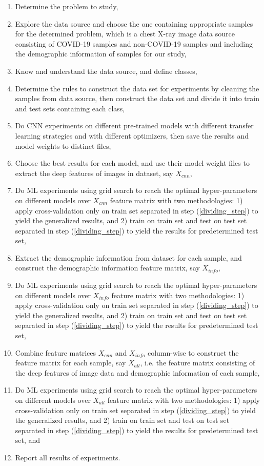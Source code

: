 \begin{enumerate}
    \item Determine the problem to study,
    \item Explore the data source and choose the one containing appropriate samples  for the determined problem, which is a chest X-ray image data source consisting of COVID-19 samples and non-COVID-19 samples and including the demographic information of samples for our study,
    \item Know and understand the data source, and define classes,
    \item Determine the rules to construct the data set for experiments by cleaning the samples from data source, then construct the data set and divide it into train and test sets containing each class, \label{dividing_step}
    \item Do CNN experiments on different pre-trained models with different transfer learning strategies and with different optimizers, then save the results and model weights to distinct files,
    \item Choose the best results for each model, and use their model weight files to extract the deep features of images in dataset, say $X_{cnn}$,
    \item Do ML experiments using grid search to reach the optimal hyper-parameters on different models over $X_{cnn}$ feature matrix with two methodologies: 1) apply cross-validation only on train set separated in step (\ref{dividing_step}) to yield the generalized results, and 2) train on train set and test on test set separated in step (\ref{dividing_step}) to yield the results for predetermined test set, \label{ML_experiment_step}
    \item Extract the demographic information from dataset for each sample, and construct the demographic information feature matrix, say $X_{info}$,
    \item Do ML experiments using grid search to reach the optimal hyper-parameters on different models over $X_{info}$ feature matrix with two methodologies: 1) apply cross-validation only on train set separated in step (\ref{dividing_step}) to yield the generalized results, and 2) train on train set and test on test set separated in step (\ref{dividing_step}) to yield the results for predetermined test set,
    \item Combine feature matrices $X_{cnn}$ and $X_{info}$ column-wise to construct the feature matrix for each sample, say $X_{all}$, i.e. the feature matrix consisting of the deep features of image data and demographic information of each sample,
    \item Do ML experiments using grid search to reach the optimal hyper-parameters on different models over $X_{all}$ feature matrix with two methodologies: 1) apply cross-validation only on train set separated in step (\ref{dividing_step}) to yield the generalized results, and 2) train on train set and test on test set separated in step (\ref{dividing_step}) to yield the results for predetermined test set, and
    \item Report all results of experiments.
\end{enumerate}

